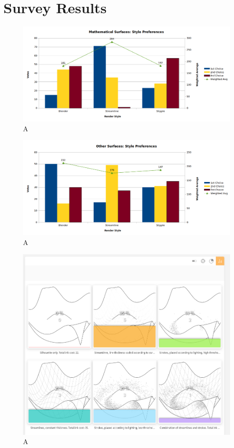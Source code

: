 \FloatBarrier
\section{Survey Results}\label{appendix_eval_results}

\begin{figure}[h!]
	\centering
	\includegraphics[width=\textwidth]{images/eval_chart_styles_math.png}
	\caption{A}\label{eval_chart_styles_math}
\end{figure}

\begin{figure}[h!]
	\centering
	\includegraphics[width=\textwidth]{images/eval_chart_styles_other.png}
	\caption{A}\label{eval_chart_styles_other}
\end{figure}

\begin{figure}[h!]
	\centering
	\includegraphics[width=\textwidth]{images/eval_ink.png}
	\caption{A}\label{eval_ink}
\end{figure}